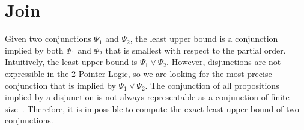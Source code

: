 
\section{Join}

Given two conjunctions $\Psi_1$ and $\Psi_2$, the least upper bound is a conjunction implied by both $\Psi_1$ and $\Psi_2$ that is smallest with respect to the partial order.
Intuitively, the least upper bound is $\Psi_1 \lor \Psi_2$.
However, disjunctions are not expressible in the 2-Pointer Logic, so we are looking for the most precise conjunction that is implied by $\Psi_1 \lor \Psi_2$.
The conjunction of all propositions implied by a disjunction is not always representable as a conjunction of finite size~\cite{join,2pointer}. Therefore, it is impossible to compute the exact least upper bound of two conjunctions.


